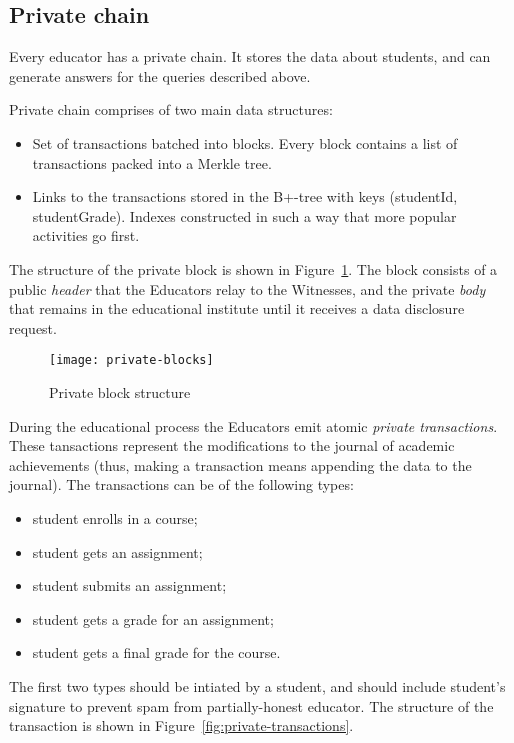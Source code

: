 \subsection{Private chain}
\label{sec:priv-chain}

Every educator has a private chain. It stores the data about students, and can generate answers for the queries described above.

Private chain comprises of two main data structures:
\begin{itemize}
\item Set of transactions batched into blocks. Every block contains a list of transactions packed into a Merkle tree.
\item Links to the transactions stored in the B+-tree with keys (studentId, studentGrade). Indexes constructed in such a way that more popular activities go first.
\end{itemize}

The structure of the private block is shown in Figure~\ref{fig:privateblocks}. The block consists of a public \textit{header} that the Educators relay to the Witnesses, and the private \textit{body} that remains in the educational institute until it receives a data disclosure request.

\begin{figure}[ht]
\centering
\texttt{[image: private-blocks]}
\caption{Private block structure}
\label{fig:privateblocks}
\end{figure}

During the educational process the Educators emit atomic \textit{private transactions}. These tansactions represent the modifications to the journal of academic achievements (thus, making a transaction means appending the data to the journal). The transactions can be of the following types:
\begin{itemize}
\item student enrolls in a course;
\item student gets an assignment;
\item student submits an assignment;
\item student gets a grade for an assignment;
\item student gets a final grade for the course.
\end{itemize}

The first two types should be intiated by a student, and should include student's signature to prevent spam from partially-honest educator.
The structure of the transaction is shown in Figure~\ref{fig:private-transactions}.

